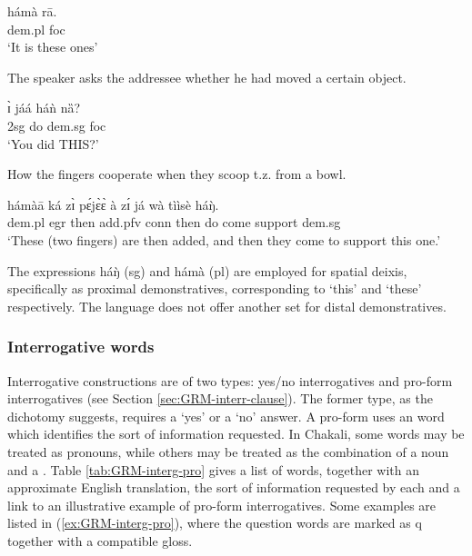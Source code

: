 \begin{exe}
\begin{exe}
\begin{exe}
\begin{exe}
\begin{exe}
\begin{exe}
\begin{exe}
\begin{exe}
\begin{exe}
   \ex\label{ex:GRM-demons-pro-reply-1pl}
    \gll hámà rā.\\
   {\sc dem.pl} {\sc foc}\\
 \glt `It is these ones' 
 
\z 
 \z



\ea\label{ex:GRM-demons-pro-quest}{\rm The speaker asks the addressee whether 
he had moved a certain object.} 

 \gll   ɪ̀ jáá háǹ nȁ?\\
  {\sc 2sg} do {\sc dem.sg}  {\sc foc}\\
 \glt `You did THIS?' 

\z

\newpage 
\ea\label{ex:GRM-demons-pro-quest1}{\rm How the fingers cooperate
when they scoop t.z. from a bowl.}

 \gll hámàā ká zɪ̀ pɛ́jɛ̀ɛ̀ à zɪ́ já wà tììsè  háŋ̀.\\
 {\sc dem.pl} {\sc egr} then add.{\sc pfv} {\sc conn}  then do come support {\sc dem.sg}\\
 
\glt `These (two fingers) are then added, and then they come to support  this one.' 

\z



The expressions {\sls háŋ̀} ({\sc sg}) and {\sls hámà}
({\sc pl}) are employed for spatial deixis, specifically as proximal
demonstratives, corresponding to `this' and `these' respectively. The
language does not offer another set for distal demonstratives.



\subsubsection{Interrogative words}
\label{sec:GRM-interg-pro}


Interrogative constructions are of two types:  yes/no interrogatives and  pro-form interrogatives 
(see Section \ref{sec:GRM-interr-clause}). The former type, as the dichotomy suggests, requires  
a `yes' or a `no' answer.  A pro-form   uses  an  word which identifies 
the sort of information requested. In Chakali,  some  words may be treated as 
pronouns, while others may be treated as the combination of a noun and a .  Table 
\ref{tab:GRM-interg-pro} gives a list of  words, together with an approximate English 
translation,  the sort of information requested by each  and a link to an illustrative example of 
pro-form interrogatives.  Some examples are listed in (\ref{ex:GRM-interg-pro}), where the question 
words are marked as  {\sc q}  together with a compatible gloss.



\end{exe}
\end{exe}
\end{exe}
\end{exe}
\end{exe}
\end{exe}
\end{exe}
\end{exe}
\end{exe}
